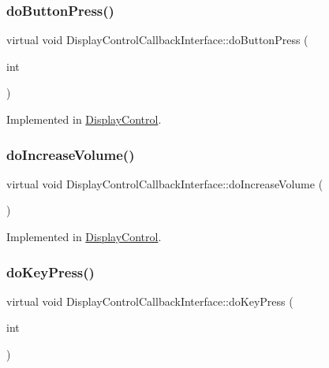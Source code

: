 \subsubsection{\texorpdfstring{do\+Button\+Press()}{doButtonPress()}}
{\footnotesize\ttfamily virtual void Display\+Control\+Callback\+Interface\+::do\+Button\+Press (\begin{DoxyParamCaption}\item[{int}]{ }\end{DoxyParamCaption})\hspace{0.3cm}{\ttfamily [pure virtual]}}



Implemented in \hyperlink{classDisplayControl_a5f45c36e699afa1d56b2af78e5125aca}{Display\+Control}.

\mbox{\label{classDisplayControlCallbackInterface_a78d7afe70cf3d2f524824efe087f0069}} 
\subsubsection{\texorpdfstring{do\+Increase\+Volume()}{doIncreaseVolume()}}
{\footnotesize\ttfamily virtual void Display\+Control\+Callback\+Interface\+::do\+Increase\+Volume (\begin{DoxyParamCaption}{ }\end{DoxyParamCaption})\hspace{0.3cm}{\ttfamily [pure virtual]}}



Implemented in \hyperlink{classDisplayControl_a8a361b4c25ef55b86b5c2d178ffa516f}{Display\+Control}.

\mbox{\label{classDisplayControlCallbackInterface_afdf32e210ff484bfd669b9de84c94dba}} 
\subsubsection{\texorpdfstring{do\+Key\+Press()}{doKeyPress()}}
{\footnotesize\ttfamily virtual void Display\+Control\+Callback\+Interface\+::do\+Key\+Press (\begin{DoxyParamCaption}\item[{int}]{ }\end{DoxyParamCaption})\hspace{0.3cm}{\ttfamily [pure virtual]}}



